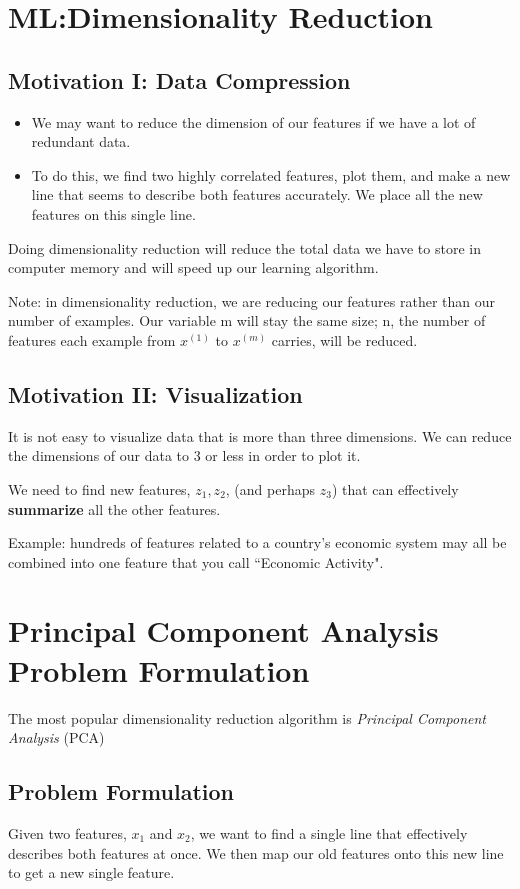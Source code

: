 \section{ML:Dimensionality Reduction}
\subsection{Motivation I: Data Compression}
\begin{itemize}
	\item We may want to reduce the dimension of our features if we have a lot of redundant data.
	\item To do this, we find two highly correlated features, plot them, and make a new line that seems to describe both features accurately. We place all the new features on this single line.
\end{itemize}
Doing dimensionality reduction will reduce the total data we have to store in computer memory and will speed up our learning algorithm.

Note: in dimensionality reduction, we are reducing our features rather than our number of examples. Our variable m will stay the same size; n, the number of features each example from $x^{(1)}$ to $x^{(m)}$ carries, will be reduced.
\subsection{Motivation II: Visualization}
It is not easy to visualize data that is more than three dimensions. We can reduce the dimensions of our data to 3 or less in order to plot it.

We need to find new features, $z_1, z_2$, (and perhaps $z_3$) that can effectively \textbf{summarize} all the other features.

Example: hundreds of features related to a country's economic system may all be combined into one feature that you call ``Economic Activity".
\section{Principal Component Analysis Problem Formulation}
The most popular dimensionality reduction algorithm is \textit{Principal Component Analysis} (PCA)
\subsection{Problem Formulation}
Given two features, $x_1$ and $x_2$, we want to find a single line that effectively describes both features at once. We then map our old features onto this new line to get a new single feature.

